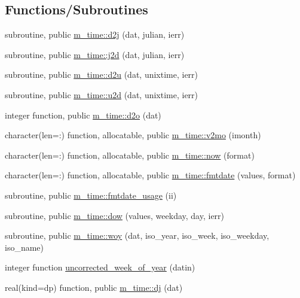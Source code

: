 \subsection*{Functions/\+Subroutines}
\begin{DoxyCompactItemize}
\item 
subroutine, public \mbox{\hyperlink{namespacem__time_a12cbfe4ebed008f4cdf88df4358df8ad}{m\+\_\+time\+::d2j}} (dat, julian, ierr)
\item 
subroutine, public \mbox{\hyperlink{namespacem__time_a4da84079c6587a8aaa8ef32169a84cc5}{m\+\_\+time\+::j2d}} (dat, julian, ierr)
\item 
subroutine, public \mbox{\hyperlink{namespacem__time_ac4bd98688e1277ab6cfc16697331406c}{m\+\_\+time\+::d2u}} (dat, unixtime, ierr)
\item 
subroutine, public \mbox{\hyperlink{namespacem__time_a6c01c810eb2acce767d2f24b9aaefa56}{m\+\_\+time\+::u2d}} (dat, unixtime, ierr)
\item 
integer function, public \mbox{\hyperlink{namespacem__time_a727dd77bbd4a5d0e3947c5d303845947}{m\+\_\+time\+::d2o}} (dat)
\item 
character(len=\+:) function, allocatable, public \mbox{\hyperlink{namespacem__time_a6f28cf00e4998bb50bb503f5e4bd3f77}{m\+\_\+time\+::v2mo}} (imonth)
\item 
character(len=\+:) function, allocatable, public \mbox{\hyperlink{namespacem__time_a6b5e87be0e510ff268c1ecfbf67a3bdb}{m\+\_\+time\+::now}} (format)
\item 
character(len=\+:) function, allocatable, public \mbox{\hyperlink{namespacem__time_a2cb84c9b8af4f395b76aed76e1431328}{m\+\_\+time\+::fmtdate}} (values, format)
\item 
subroutine, public \mbox{\hyperlink{namespacem__time_a0ec30ca32f18ec409bbbef046a9e73f0}{m\+\_\+time\+::fmtdate\+\_\+usage}} (ii)
\item 
subroutine, public \mbox{\hyperlink{namespacem__time_adfda8a89820b8d0ad4581a14896e4ce5}{m\+\_\+time\+::dow}} (values, weekday, day, ierr)
\item 
subroutine, public \mbox{\hyperlink{namespacem__time_aea9216971a364d79beb307f36e9e3873}{m\+\_\+time\+::woy}} (dat, iso\+\_\+year, iso\+\_\+week, iso\+\_\+weekday, iso\+\_\+name)
\item 
integer function \mbox{\hyperlink{M__journal_8f90_a41382743ce1b42e02a3f42146e3fa53f}{uncorrected\+\_\+week\+\_\+of\+\_\+year}} (datin)
\item 
real(kind=dp) function, public \mbox{\hyperlink{namespacem__time_ad3ce73217cd51090b52a0468b045c0f3}{m\+\_\+time\+::dj}} (dat)

\end{DoxyCompactItemize}
